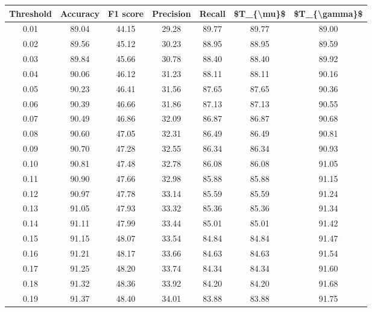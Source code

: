 \begin{tabular}{|c|c|c|c|c|c|c|}
\hline
 Threshold &  Accuracy &  F1 score &  Precision &  Recall &  \$T\_\{\textbackslash mu\}\$ &  \$T\_\{\textbackslash gamma\}\$ \\
\hline
      0.01 &     89.04 &     44.15 &      29.28 &   89.77 &      89.77 &         89.00 \\
      0.02 &     89.56 &     45.12 &      30.23 &   88.95 &      88.95 &         89.59 \\
      0.03 &     89.84 &     45.66 &      30.78 &   88.40 &      88.40 &         89.92 \\
      0.04 &     90.06 &     46.12 &      31.23 &   88.11 &      88.11 &         90.16 \\
      0.05 &     90.23 &     46.41 &      31.56 &   87.65 &      87.65 &         90.36 \\
      0.06 &     90.39 &     46.66 &      31.86 &   87.13 &      87.13 &         90.55 \\
      0.07 &     90.49 &     46.86 &      32.09 &   86.87 &      86.87 &         90.68 \\
      0.08 &     90.60 &     47.05 &      32.31 &   86.49 &      86.49 &         90.81 \\
      0.09 &     90.70 &     47.28 &      32.55 &   86.34 &      86.34 &         90.93 \\
      0.10 &     90.81 &     47.48 &      32.78 &   86.08 &      86.08 &         91.05 \\
      0.11 &     90.90 &     47.66 &      32.98 &   85.88 &      85.88 &         91.15 \\
      0.12 &     90.97 &     47.78 &      33.14 &   85.59 &      85.59 &         91.24 \\
      0.13 &     91.05 &     47.93 &      33.32 &   85.36 &      85.36 &         91.34 \\
      0.14 &     91.11 &     47.99 &      33.44 &   85.01 &      85.01 &         91.42 \\
      0.15 &     91.15 &     48.07 &      33.54 &   84.84 &      84.84 &         91.47 \\
      0.16 &     91.21 &     48.17 &      33.66 &   84.63 &      84.63 &         91.54 \\
      0.17 &     91.25 &     48.20 &      33.74 &   84.34 &      84.34 &         91.60 \\
      0.18 &     91.32 &     48.36 &      33.92 &   84.20 &      84.20 &         91.68 \\
      0.19 &     91.37 &     48.40 &      34.01 &   83.88 &      83.88 &         91.75 \\

\end{tabular}
